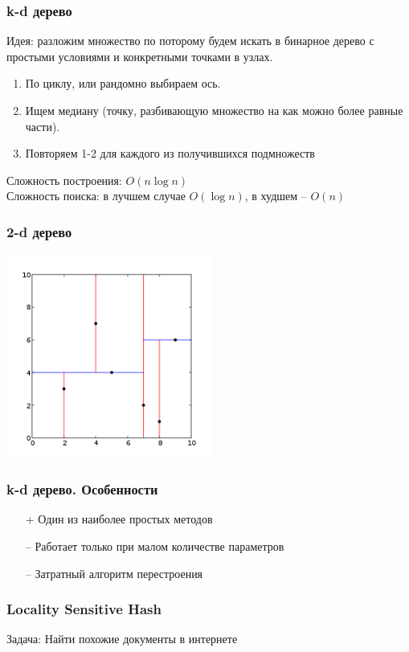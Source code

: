 \documentclass[10pt]{beamer}
\begin{document}
\begin{frame}\frametitle{k-d дерево}
	\alert{Идея}: разложим множество по поторому будем искать в бинарное дерево с простыми условиями и конкретными точками в узлах.
	\bigbreak
	\begin{enumerate}
		\item По циклу, или рандомно выбираем ось.
		\item Ищем медиану (точку, разбивающую множество на как можно более равные части).
		\item Повторяем 1-2 для каждого из получившихся подмножеств 
	\end{enumerate}
	Сложность построения: $O(n\log n)$\\
	Сложность поиска: в лучшем случае $O(\log n)$, в худшем -- $O(n)$
\end{frame}

\begin{frame}\frametitle{2-d дерево}
	\begin{center}
    	\includegraphics[height=190pt]{images/Kdtree_2d}  	
	\end{center}
\end{frame}

\begin{frame}\frametitle{k-d дерево. Особенности}
	\begin{itemize}
	\item[+] Один из наиболее простых методов
	\item[--] Работает только при малом количестве параметров
	\item[--] Затратный алгоритм перестроения
	\end{itemize}
\end{frame}

\begin{frame}\frametitle{Locality Sensitive Hash}
  \alert{Задача}: Найти похожие документы в интернете\\
\end{frame}
\end{document}
